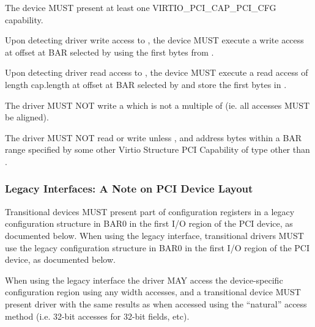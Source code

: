 The device MUST present at least one VIRTIO_PCI_CAP_PCI_CFG capability.

Upon detecting driver write access
to , the device MUST execute a write access
at offset  at BAR selected by  using the first 
bytes from .

Upon detecting driver read access
to , the device MUST
execute a read access of length cap.length at offset 
at BAR selected by  and store the first  bytes in
.


The driver MUST NOT write a  which is not
a multiple of  (ie. all accesses MUST be aligned).

The driver MUST NOT read or write 
unless ,  and 
address  bytes within a BAR range
specified by some other Virtio Structure PCI Capability
of type other than .

\subsubsection{Legacy Interfaces: A Note on PCI Device Layout}\label{sec:Virtio Transport Options / Virtio Over PCI Bus / PCI Device Layout / Legacy Interfaces: A Note on PCI Device Layout}

Transitional devices MUST present part of configuration
registers in a legacy configuration structure in BAR0 in the first I/O
region of the PCI device, as documented below.
When using the legacy interface, transitional drivers
MUST use the legacy configuration structure in BAR0 in the first
I/O region of the PCI device, as documented below.

When using the legacy interface the driver MAY access
the device-specific configuration region using any width accesses, and
a transitional device MUST present driver with the same results as
when accessed using the ``natural'' access method (i.e.
32-bit accesses for 32-bit fields, etc).

